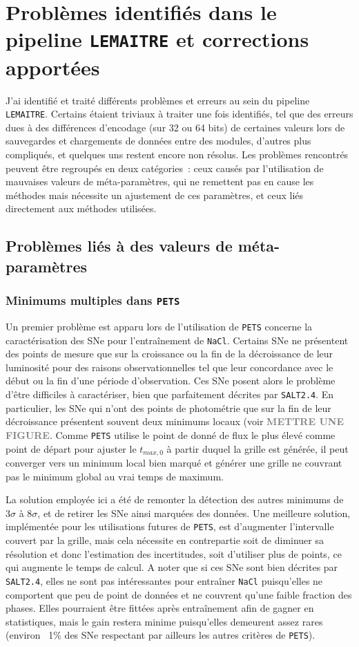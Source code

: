 \documentclass{book}
\newcommand{\todo}[1]{{\textcolor{gray}{\bf \large #1}}}
\def\lemaitre{\texttt{LEMAITRE}\xspace}
\def\pets{\texttt{PETS}\xspace}
\def\nacl{\texttt{NaCl}\xspace}
\def\saltd{\texttt{SALT2.4}\xspace}
\begin{document}
\section{Problèmes identifiés dans le pipeline \lemaitre et corrections apportées}

J'ai identifié et traité différents problèmes et erreurs au sein du pipeline \lemaitre. Certains étaient triviaux à traiter une fois identifiés, tel que des erreurs dues à des différences d'encodage (sur 32 ou 64 bits) de certaines valeurs lors de sauvegardes et chargements de données entre des modules, d'autres plus compliqués, et quelques uns restent encore non résolus. Les problèmes rencontrés peuvent être regroupés en deux catégories~: ceux causés par l'utilisation de mauvaises valeurs de méta-paramètres, qui ne remettent pas en cause les méthodes mais nécessite un ajustement de ces paramètres, et ceux liés directement aux méthodes utilisées.

\subsection{Problèmes liés à des valeurs de méta-paramètres}

\subsubsection{Minimums multiples dans \pets}

Un premier problème est apparu lors de l'utilisation de \pets concerne la caractérisation des SNe pour l'entraînement de \nacl. Certains SNe ne présentent des points de mesure que sur la croissance ou la fin de la décroissance de leur luminosité pour des raisons observationnelles tel que leur concordance avec le début ou la fin d'une période d'observation. Ces SNe posent alors le problème d'être difficiles à caractériser, bien que parfaitement décrites par \saltd. En particulier, les SNe qui n'ont des points de photométrie que sur la fin de leur décroissance présentent souvent deux minimums locaux (voir \todo{METTRE UNE FIGURE}. Comme \pets utilise le point de donné de flux le plus élevé comme point de départ pour ajuster le $t_{max, 0}$ à partir duquel la grille est générée, il peut converger vers un minimum local bien marqué et générer une grille ne couvrant pas le minimum global au vrai temps de maximum.

La solution employée ici a été de remonter la détection des autres minimums de $3\sigma$ à $8\sigma$, et de retirer les SNe ainsi marquées des données. Une meilleure solution, implémentée pour les utilisations futures de \pets, est d'augmenter l'intervalle couvert par la grille, mais cela nécessite en contrepartie soit de diminuer sa résolution et donc l'estimation des incertitudes, soit d'utiliser plus de points, ce qui augmente le temps de calcul. A noter que si ces SNe sont bien décrites par \saltd, elles ne sont pas intéressantes pour entraîner \nacl puisqu'elles ne comportent que peu de point de données et ne couvrent qu'une faible fraction des phases. Elles pourraient être fittées après entraînement afin de gagner en statistiques, mais le gain restera minime puisqu'elles demeurent assez rares (environ ~1\% des SNe respectant par ailleurs les autres critères de \pets).
\end{document}

